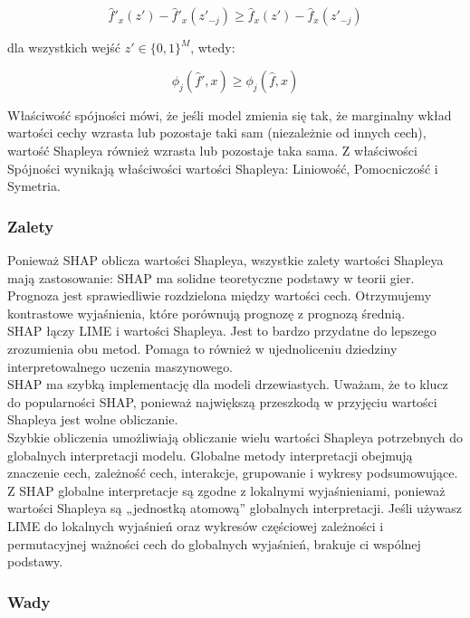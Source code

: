 \[
\hat{f}'_x(z') - \hat{f}'_x(z'_{-j}) \ge \hat{f}_x(z') - \hat{f}_x(z'_{-j})
\]

dla wszystkich wejść $z' \in \{0,1\}^M$, wtedy:

\[
\phi_j(\hat{f}',x) \ge \phi_j(\hat{f},x)
\]

Właściwość spójności mówi, że jeśli model zmienia się tak, że marginalny wkład wartości cechy wzrasta lub pozostaje taki sam (niezależnie od innych cech), wartość Shapleya również wzrasta lub pozostaje taka sama. Z właściwości Spójności wynikają właściwości wartości Shapleya: Liniowość, Pomocniczość i Symetria. \cite{shap} \\

\subsubsection{Zalety}

Ponieważ SHAP oblicza wartości Shapleya, wszystkie zalety wartości Shapleya mają zastosowanie: SHAP ma solidne teoretyczne podstawy w teorii gier. Prognoza jest sprawiedliwie rozdzielona między wartości cech. Otrzymujemy kontrastowe wyjaśnienia, które porównują prognozę z prognozą średnią. \cite{shap}\\

SHAP łączy LIME i wartości Shapleya. Jest to bardzo przydatne do lepszego zrozumienia obu metod. Pomaga to również w ujednoliceniu dziedziny interpretowalnego uczenia maszynowego. \cite{shap}\\

SHAP ma szybką implementację dla modeli drzewiastych. Uważam, że to klucz do popularności SHAP, ponieważ największą przeszkodą w przyjęciu wartości Shapleya jest wolne obliczanie. \cite{shap}\\

Szybkie obliczenia umożliwiają obliczanie wielu wartości Shapleya potrzebnych do globalnych interpretacji modelu. Globalne metody interpretacji obejmują znaczenie cech, zależność cech, interakcje, grupowanie i wykresy podsumowujące. Z SHAP globalne interpretacje są zgodne z lokalnymi wyjaśnieniami, ponieważ wartości Shapleya są „jednostką atomową” globalnych interpretacji. Jeśli używasz LIME do lokalnych wyjaśnień oraz wykresów częściowej zależności i permutacyjnej ważności cech do globalnych wyjaśnień, brakuje ci wspólnej podstawy. \cite{shap}\\

\subsubsection{Wady}

